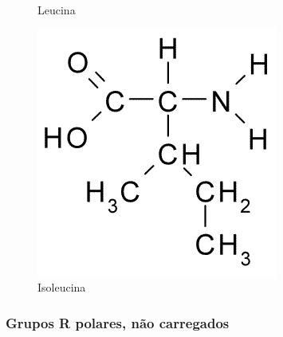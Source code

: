 \begin{figure}[H]
\begin{center}
\begin{minipage}{0.3\linewidth}
			\caption{Leucina}
			\label{fig:leucine}
		\end{minipage}
		\begin{minipage}{0.3\linewidth}
			\centering   
			\includegraphics[width=0.8\linewidth]{secProteins/figures/isoleucine.png}
			\caption{Isoleucina}
			\label{fig:isoleucine}
		\end{minipage}
	\end{center}
\end{figure}

\subsubsection*{Grupos R polares, não carregados}	

